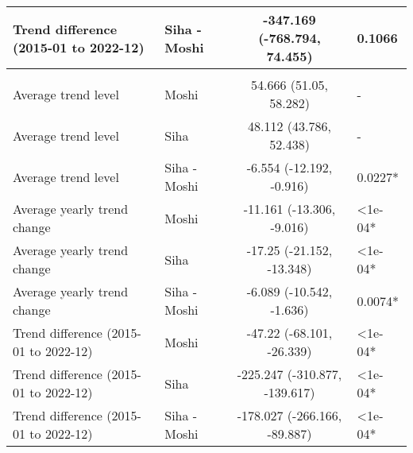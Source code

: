 \begin{longtable}{l|lcl}
Trend difference (2015-01 to 2022-12) & Siha - Moshi & -347.169 (-768.794, 74.455) & 0.1066 \\ 
\midrule\addlinespace[2.5pt]
\multicolumn{4}{l}{Vector-borne Infections} \\[2.5pt] 
\midrule\addlinespace[2.5pt]
Average trend level & Moshi & 54.666 (51.05, 58.282) & - \\ 
Average trend level & Siha & 48.112 (43.786, 52.438) & - \\ 
Average trend level & Siha - Moshi & -6.554 (-12.192, -0.916) & 0.0227* \\ 
Average yearly trend change & Moshi & -11.161 (-13.306, -9.016) & <1e-04* \\ 
Average yearly trend change & Siha & -17.25 (-21.152, -13.348) & <1e-04* \\ 
Average yearly trend change & Siha - Moshi & -6.089 (-10.542, -1.636) & 0.0074* \\ 
Trend difference (2015-01 to 2022-12) & Moshi & -47.22 (-68.101, -26.339) & <1e-04* \\ 
Trend difference (2015-01 to 2022-12) & Siha & -225.247 (-310.877, -139.617) & <1e-04* \\ 
Trend difference (2015-01 to 2022-12) & Siha - Moshi & -178.027 (-266.166, -89.887) & <1e-04* \\ 
\bottomrule
\end{longtable}
\endgroup

